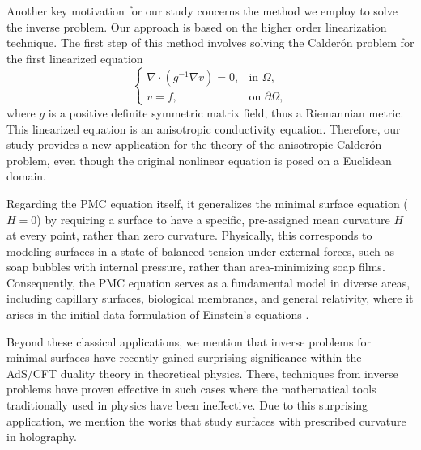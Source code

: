 \documentclass[a4paper, 10pt, twoside, notitlepage]{amsart}
\theoremstyle{plain}
\newcommand{\Om}{\Omega}
\numberwithin{equation}{section}
\begin{document}
Another key motivation for our study concerns the method we employ to solve the inverse problem. Our approach is based on the higher order linearization technique. The first step of this method involves solving the Calder\'on problem for the first linearized equation
\begin{equation}\label{eq:linearized}
	\begin{cases}
		\nabla \cdot \left( g^{-1} \nabla v \right) = 0, & \text{in } \Om, \\
		v = f, & \text{on } \partial \Om,
	\end{cases}
\end{equation}
where \( g \) is a positive definite symmetric matrix field, thus a Riemannian metric. This linearized equation is an anisotropic conductivity equation. Therefore, our study provides a new application for the theory of the anisotropic Calder\'on problem, even though the original nonlinear equation is posed on a Euclidean domain.  


Regarding the PMC equation itself, it generalizes the minimal surface equation (\( H=0 \)) by requiring a surface to have a specific, pre-assigned mean curvature \( H \) at every point, rather than zero curvature. Physically, this corresponds to modeling surfaces in a state of balanced tension under external forces, such as soap bubbles with internal pressure, rather than area-minimizing soap films. Consequently, the PMC equation serves as a fundamental model in diverse areas, including capillary surfaces, biological membranes, and general relativity, where it arises in the initial data formulation of Einstein's equations \cite{seifert1997configurations, chrusciel2010mathematical}.

Beyond these classical applications, we mention that inverse problems for minimal surfaces have recently gained surprising significance  within the AdS/CFT duality theory in theoretical physics. There, techniques from inverse problems have proven effective in such cases \cite{jokela2025bulk}  where the mathematical
tools traditionally used in physics have been ineffective. 
Due to this surprising application, we mention the works \cite{hung2011holographic, dong2014holographic} that study surfaces with prescribed curvature in holography.

\end{document}
